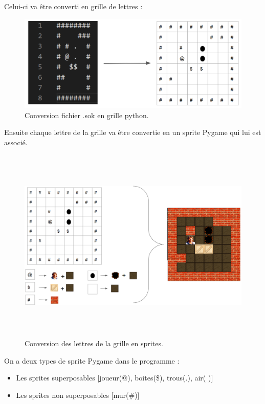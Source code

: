 \documentclass[a4paper,12pt]{article}
\begin{document}
Celui-ci va être converti en grille de lettres :

\begin{figure}[H]
\begin{center}
\includegraphics[width=5in]{./Illustrations/map_2.png}
\end{center}
\caption{Conversion fichier .sok en grille python.}
\end{figure}

Ensuite chaque lettre de la grille va être convertie en un sprite Pygame qui lui est associé.\\

\begin{figure}[H]
\begin{center}
\includegraphics[width=7in, height=3.7in]{./Illustrations/map_3.png}
\end{center}
\caption{Conversion des lettres de la grille en sprites.}
\end{figure}

On a deux types de sprite Pygame dans le programme :
\begin{itemize}
\item Les sprites superposables [joueur(@), boites(\$), trous(.), air( )]
\item Les sprites non superposables [mur(\#)]
\end{itemize}
\end{document}

